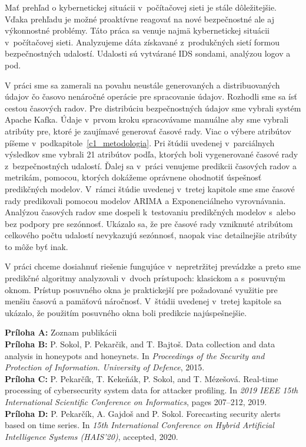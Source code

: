 \documentclass[thesismargins, thesislinespacing, openright, upjsfrontpage]{rnthesis}
\begin{document}

\zaver

Mať prehľad o kybernetickej situácii v~počítačovej sieti je stále dôležitejšie. Vďaka prehľadu je možné proaktívne reagovať na nové bezpečnostné ale aj výkonnostné problémy. Táto práca sa venuje najmä kybernetickej situácii v~počítačovej sieti. Analyzujeme dáta získavané z~produkčných sietí formou bezpečnostných udalostí. Udalosti sú vytvárané IDS sondami, analýzou logov a pod. 

V práci sme sa zamerali na povahu neustále generovaných a distribuovaných údajov čo časovo nenáročné operácie pre spracovanie údajov. Rozhodli sme sa ísť cestou časových radov. Pre distribúciu bezpečnostných údajov sme vybrali systém Apache Kafka. Údaje v~prvom kroku spracovávame manuálne aby sme vybrali atribúty pre, ktoré je zaujímavé generovať časové rady. Viac o výbere atribútov píšeme v~podkapitole~\ref{c1_metodologia}. Pri štúdii uvedenej v~parciálnych výsledkov sme vybrali 21 atribútov podľa, ktorých boli vygenerované časové rady z~bezpečnostných udalostí. Ďalej sa v~práci venujeme predikcii časových radov a metrikám, pomocou, ktorých dokážeme oprávnene ohodnotiť úspešnosť predikčných modelov. V~rámci štúdie uvedenej v~tretej kapitole sme sme časové rady predikovali pomocou modelov ARIMA a Exponenciálneho vyrovnávania. Analýzou časových radov sme dospeli k~testovaniu predikčných modelov s~alebo bez podpory pre sezónnosť. Ukázalo sa, že pre časové rady vzniknuté atribútom celkového počtu udalostí nevykazujú sezónnosť, naopak viac detailnejšie atribúty to môže byť inak.

V práci chceme dosiahnuť riešenie fungujúce v~nepretržitej prevádzke a preto sme predikčné algoritmy analyzovali v~dvoch prístupoch: klasickom a s~posuvným oknom. Prístup posuvného okna je praktickejší pre požadované využitie pre menšiu časovú a pamäťovú náročnosť. V~štúdii uvedenej v~tretej kapitole sa ukázalo, že použitím posuvného okna boli predikcie najúspešnejšie.

%
%
\prilohy

\textbf{Príloha A:} Zoznam publikácii \\
\textbf{Príloha B:} P. Sokol, P. Pekarčik, and T. Bajtoš. Data collection and data analysis in honeypots and honeynets. In \textit{Proceedings of the Security and Protection of Information. University of Defence}, 2015. \\
\textbf{Príloha C:} P. Pekarčík, T. Kekeňák, P. Sokol, and T. Mézešová. Real-time processing of cybersecurity system data for attacker profiling. In \textit{2019 IEEE 15th International Scientific Conference on Informatics}, pages 207–212, 2019. \\
\textbf{Príloha D:} P. Pekarčík, A. Gajdoš and P. Sokol. Forecasting security alerts based on time series. In \textit{15th International Conference on Hybrid Artificial Intelligence Systems (HAIS’20)}, accepted, 2020.
\end{document}
